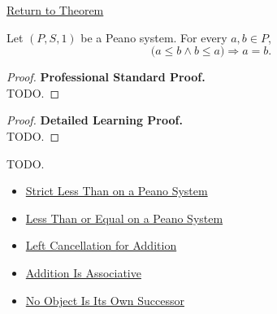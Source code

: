 \newpage
{}
\label{prf:order-antisymmetric-on-peano-system}

\begin{remark*}[Return]
\hyperref[thm:order-antisymmetric-on-peano-system]{Return to Theorem}
\end{remark*}

\begin{theorem*}
Let $(P,S,1)$ be a Peano system. For every $a,b \in P$,
\[
\bigl(a \le b \land b \le a\bigr)
\Longrightarrow
a=b.
\]
\end{theorem*}

\begin{proof}
\textbf{Professional Standard Proof.}~\\
TODO.
\end{proof}

\begin{proof}
\textbf{Detailed Learning Proof.}~\\
TODO.
\end{proof}

\begin{remark*}
TODO.
\end{remark*}

\begin{dependencies}
\begin{itemize}
  \item \hyperref[def:strict-less-than-on-peano-system]{Strict Less Than on a Peano System}
  \item \hyperref[def:less-than-or-equal-on-peano-system]{Less Than or Equal on a Peano System}
  \item \hyperref[thm:addition-left-cancellation]{Left Cancellation for Addition}
  \item \hyperref[thm:addition-associative]{Addition Is Associative}
  \item \hyperref[thm:no-object-is-its-own-successor]{No Object Is Its Own Successor}
\end{itemize}
\end{dependencies}
